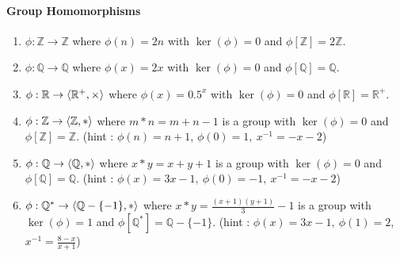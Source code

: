 \paragraph{Group Homomorphisms}
\begin{enumerate}
	\item $\phi : \mathbb{Z} \to \mathbb{Z}$ where $\phi(n)=2n$ with $\ker(\phi) = 0$ and $\phi[\mathbb{Z}] = 2\mathbb{Z}$.
	\item $\phi : \mathbb{Q} \to \mathbb{Q}$ where $\phi(x)=2x$ with $\ker(\phi) = 0$ and $\phi[\mathbb{Q}] = \mathbb{Q}$.
	\item $\phi : \mathbb{R} \to \left\langle \mathbb{R}^+,\times \right\rangle$ where $\phi(x)=0.5^x$ with $\ker(\phi) = 0$ and $\phi[\mathbb{R}] = \mathbb{R}^+$.
	\item $\phi : \mathbb{Z} \to \left\langle \mathbb{Z},\ast \right\rangle$ where $m \ast n = m+n-1 $ is a group with $\ker(\phi) = 0$ and $\phi[\mathbb{Z}] = \mathbb{Z}$.
		(hint : $\phi(n) = n+1$, $\phi(0) = 1,\ x^{-1} = -x-2$)
	\item $\phi : \mathbb{Q} \to \left\langle \mathbb{Q},\ast \right\rangle$ where $x \ast y =  x+y+1$ is a group with $\ker(\phi) = 0$ and $\phi[\mathbb{Q}] = \mathbb{Q}$.
		(hint : $\phi(x) = 3x-1,\ \phi(0) = -1,\ x^{-1} = -x-2$)
	\item $\phi : \mathbb{Q}^\ast \to \left\langle \mathbb{Q}-\{-1\},\ast \right\rangle$ where $x \ast y =  \frac{(x+1)(y+1)}{3}-1$ is a group with $\ker(\phi) = 1$ and $\phi[\mathbb{Q}^\ast] = \mathbb{Q}-\{-1\}$.
		(hint : $\phi(x) = 3x-1,\ \phi(1)=2$,\ $x^{-1} = \frac{8-x}{x+1}$)
\end{enumerate}

